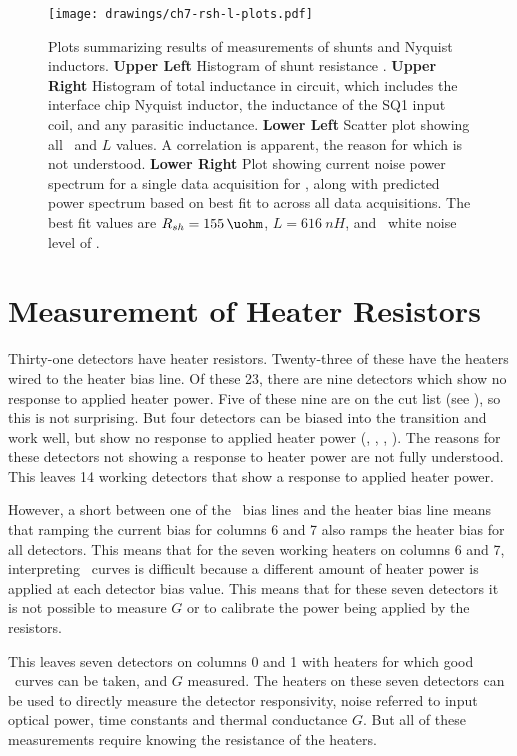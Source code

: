 \begin{figure*}
\texttt{[image: drawings/ch7-rsh-l-plots.pdf]}
\caption[Measurements of shunt resistors and Nyquist inductors]{
Plots summarizing results of measurements of shunts and Nyquist inductors.
\textbf{Upper Left} Histogram of shunt resistance \Rsh.
\textbf{Upper Right} Histogram of total inductance in circuit, which includes the interface chip Nyquist inductor, the inductance of the SQ1 input coil, and any parasitic inductance.
\textbf{Lower Left} Scatter plot showing all \Rsh\ and $L$ values. A correlation is apparent, the reason for which is not understood.
\textbf{Lower Right} Plot showing current noise power spectrum for a single data acquisition for , along with predicted power spectrum based on best fit to  across all data acquisitions. The best fit values are $\Rsh=\SI{155}{\uohm}$, $L = \SI{616}{nH}$, and \SQUID\ white noise level of .}
\label{fig:rsh-l-plots}
\end{figure*}

\section{Measurement of Heater Resistors} \label{sec:heater-r}

Thirty-one detectors have heater resistors.
Twenty-three of these have the heaters wired to the heater bias line.
Of these 23, there are nine detectors which show no response to applied heater power.
Five of these nine are on the cut list (see ), so this is not surprising.
But four detectors can be biased into the transition and work well, but show no response to applied heater power (, , , ).
The reasons for these detectors not showing a response to heater power are not fully understood.
This leaves 14 working detectors that show a response to applied heater power.

However, a short between one of the \TES\ bias lines and the heater bias line means that ramping the current bias for columns 6 and 7 also ramps the heater bias for all detectors.
This means that for the seven working heaters on columns 6 and 7, interpreting \IV\ curves is difficult because a different amount of heater power is applied at each detector bias value.
This means that for these seven detectors it is not possible to measure $G$ or to calibrate the power being applied by the resistors.

This leaves seven detectors on columns 0 and 1 with heaters for which good \IV\ curves can be taken, and $G$ measured.
The heaters on these seven detectors can be used to directly measure the detector responsivity, noise referred to input optical power, time constants and thermal conductance $G$.
But all of these measurements require knowing the resistance of the heaters.

